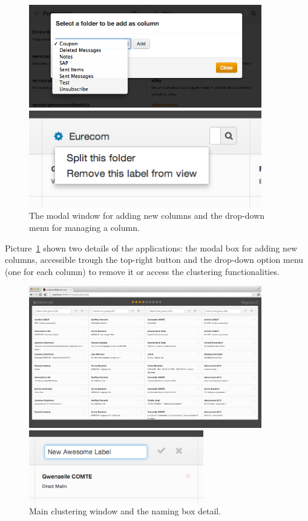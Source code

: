 \documentclass[a4paper,12pt]{report}
\begin{document}
\begin{figure}[H]
  \centering
  \includegraphics[width=4in]{main_modal_detail}
  
  \vspace{0.2in}

  \includegraphics[width=4in]{main_options}
  \caption{The modal window for adding new columns and the drop-down menu for managing a column.}
  \label{fig:main_modal}
\end{figure}
Picture~\ref{fig:main_modal} shown two details of the applications: the modal box for adding new columns, accessible trough the top-right button and the drop-down option menu (one for each column) to remove it or access the clustering functionalities.

\begin{figure}[H]
  \centering
  \includegraphics[width=4in]{clusters}
  
  \vspace{0.2in}

  \includegraphics[width=3in]{clusters_detail}
  \caption{Main clustering window and the naming box detail.}
  \label{fig:cluster}
\end{figure}
\end{document}
